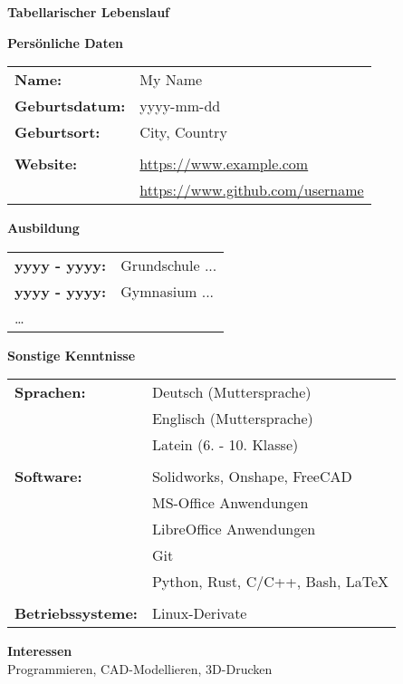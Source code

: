 \begin{center}
    {\Large \textbf{Tabellarischer Lebenslauf}}
\end{center}

\vspace{1cm}

{\large \textbf{Persönliche Daten}}\\

\begin{tabular}{m{4cm} l}
    \textbf{Name:}         & My Name\\
    \textbf{Geburtsdatum:} & yyyy-mm-dd\\
    \textbf{Geburtsort:}   & City, Country\\
                           &\\
    \textbf{Website:}      & \url{https://www.example.com}\\
                           & \url{https://www.github.com/username}
\end{tabular}

\vspace{1cm}

{\large \textbf{Ausbildung}}\\

\begin{tabular}{m{4cm} l}
    \textbf{yyyy - yyyy:} & Grundschule ...\\
    \textbf{yyyy - yyyy:} & Gymnasium ...\\
    \dots &
\end{tabular}

\vspace{1cm}

{\large \textbf{Sonstige Kenntnisse}}\\

\begin{tabular}{m{4cm} l}
    \textbf{Sprachen:}        & Deutsch (Muttersprache)\\
                              & Englisch (Muttersprache)\\
                              & Latein (6. - 10. Klasse)\\
                              &\\
    \textbf{Software:}        & Solidworks, Onshape, FreeCAD\\
                              & MS-Office Anwendungen\\
                              & LibreOffice Anwendungen\\
                              & Git\\
                              & Python, Rust, C/C++, Bash, \LaTeX\\
                              &\\
    \textbf{Betriebssysteme:} & Linux-Derivate\\
\end{tabular}

\vspace{1cm}

{\large \textbf{Interessen}}\\

Programmieren, CAD-Modellieren, 3D-Drucken
